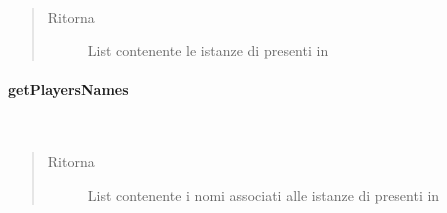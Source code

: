 \documentclass[letterpaper,10pt,italian,openany,oneside]{sphinxmanual}
\begin{document}
\begin{fulllineitems}
\label{\detokenize{source/it/unicam/cs/pa/mastermind/players/PlayerFactoryRegistry:it.unicam.cs.pa.mastermind.players.PlayerFactoryRegistry.getPlayerFactoriesInstances()}}~\begin{quote}\begin{description}
\item[{Ritorna}] \leavevmode
List contenente le istanze di  presenti in 

\end{description}\end{quote}

\end{fulllineitems}



\paragraph{getPlayersNames}
\label{\detokenize{source/it/unicam/cs/pa/mastermind/players/PlayerFactoryRegistry:getplayersnames}}

\begin{fulllineitems}
\label{\detokenize{source/it/unicam/cs/pa/mastermind/players/PlayerFactoryRegistry:it.unicam.cs.pa.mastermind.players.PlayerFactoryRegistry.getPlayersNames()}}~\begin{quote}\begin{description}
\item[{Ritorna}] \leavevmode
List contenente i nomi associati alle istanze di  presenti in 

\end{description}\end{quote}

\end{fulllineitems}
\end{document}
